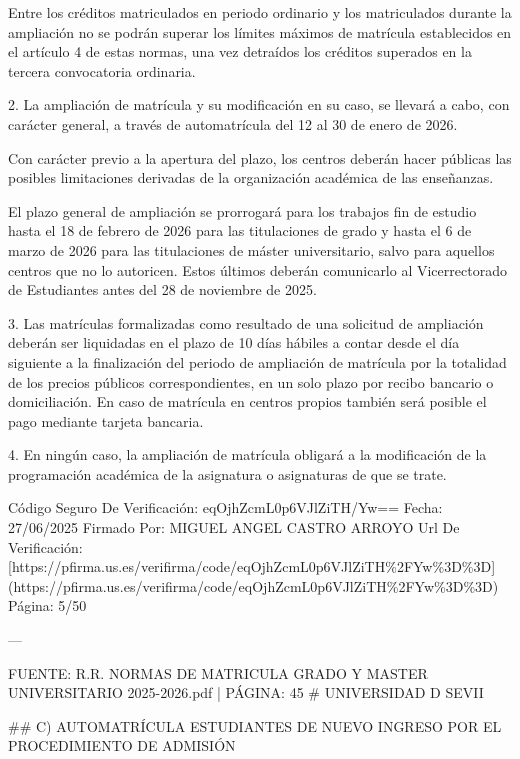 \documentclass{article}
\begin{document}
\begin{itemize}
\begin{itemize}
\begin{scriptsize}
                  Entre los créditos matriculados en periodo ordinario y los matriculados durante la ampliación no se podrán superar los límites máximos de matrícula establecidos en el artículo 4 de estas normas, una vez detraídos los créditos superados en la tercera convocatoria ordinaria.

                  2. La ampliación de matrícula y su modificación en su caso, se llevará a cabo, con carácter general, a través de automatrícula del 12 al 30 de enero de 2026.

                  Con carácter previo a la apertura del plazo, los centros deberán hacer públicas las posibles limitaciones derivadas de la organización académica de las enseñanzas.

                  El plazo general de ampliación se prorrogará para los trabajos fin de estudio hasta el 18 de febrero de 2026 para las titulaciones de grado y hasta el 6 de marzo de 2026 para las titulaciones de máster universitario, salvo para aquellos centros que no lo autoricen. Estos últimos deberán comunicarlo al Vicerrectorado de Estudiantes antes del 28 de noviembre de 2025.

                  3. Las matrículas formalizadas como resultado de una solicitud de ampliación deberán ser liquidadas en el plazo de 10 días hábiles a contar desde el día siguiente a la finalización del periodo de ampliación de matrícula por la totalidad de los precios públicos correspondientes, en un solo plazo por recibo bancario o domiciliación. En caso de matrícula en centros propios también será posible el pago mediante tarjeta bancaria.

                  4. En ningún caso, la ampliación de matrícula obligará a la modificación de la programación académica de la asignatura o asignaturas de que se trate.

                  Código Seguro De Verificación: eqOjhZcmL0p6VJlZiTH/Yw==
                  Fecha: 27/06/2025
                  Firmado Por: MIGUEL ANGEL CASTRO ARROYO
                  Url De Verificación: [https://pfirma.us.es/verifirma/code/eqOjhZcmL0p6VJlZiTH\%2FYw\%3D\%3D](https://pfirma.us.es/verifirma/code/eqOjhZcmL0p6VJlZiTH\%2FYw\%3D\%3D)
                  Página: 5/50

                  ---

                  FUENTE: R.R. NORMAS DE MATRICULA GRADO Y MASTER UNIVERSITARIO 2025-2026.pdf | PÁGINA: 45
                  \# UNIVERSIDAD D SEVII

                  \#\# C) AUTOMATRÍCULA ESTUDIANTES DE NUEVO INGRESO POR EL PROCEDIMIENTO DE ADMISIÓN


\end{scriptsize}
\end{itemize}
\end{itemize}
\end{document}
